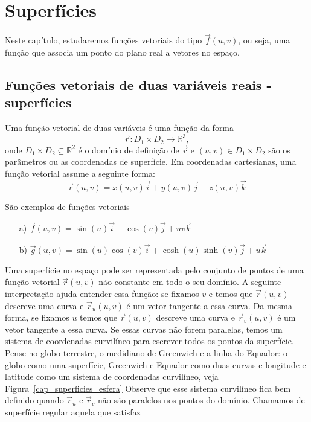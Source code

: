 \chapter{Superfícies}
Neste capítulo, estudaremos funções vetoriais do tipo $\vec{f}(u,v)$, ou seja, uma função que associa um ponto do plano real a vetores no espaço.
\section{Funções vetoriais de duas variáveis reais - superfícies}
Uma função vetorial de duas variáveis é uma função da forma $$\vec{r}:D_1\times D_2 \to \mathbb{R}^3,$$ onde $D_1\times D_2\subseteq \mathbb{R}^2$ é o domínio de definição de $\vec{r}$ e $(u,v)\in D_1\times D_2$ são os parâmetros ou as coordenadas de superfície. Em coordenadas cartesianas, uma função vetorial assume a seguinte forma:
$$\vec{r}(u,v)=x(u,v)\vec{i}+y(u,v)\vec{j}+z(u,v)\vec{k}$$
\begin{ex}\label{exfv_1} São exemplos de funções vetoriais
\begin{itemize}
\item [a)] $\vec{f}(u,v)=\sin(u)\vec{i}+\cos(v)\vec{j}+uv\vec{k}$
\item [b)] $\vec{g}(u,v)=\sin(u)\cos(v) \vec{i}+\cosh(u)\sinh(v)\vec{j}+u\vec{k}$
\end{itemize}
\end{ex}
Uma superfície no espaço pode ser representada pelo conjunto de pontos de uma função vetorial $\vec{r}(u,v)$ não constante em todo o seu domínio. A seguinte interpretação ajuda entender essa função: se fixamos $v$ e temos que $\vec{r}(u,v)$ descreve uma curva e $\vec{r}_u(u,v)$ é um vetor tangente a essa curva. Da mesma forma, se fixamos $u$ temos que $\vec{r}(u,v)$ descreve uma curva e $\vec{r}_v(u,v)$ é um vetor tangente a essa curva. Se essas curvas não forem paralelas, temos um sistema de coordenadas curvilíneo para escrever todos os pontos da superfície. Pense no globo terrestre, o medidiano de Greenwich e a linha do Equador: o globo como uma superfície, Greenwich e Equador como duas curvas e longitude e latitude como um sistema de coordenadas curvilíneo, veja Figura~\ref{cap_superficies_esfera} Observe que esse sistema curvilíneo fica bem definido quando $\vec{r}_u$ e $\vec{r}_v$ não são paralelos nos pontos do domínio. Chamamos de superfície regular aquela que satisfaz
